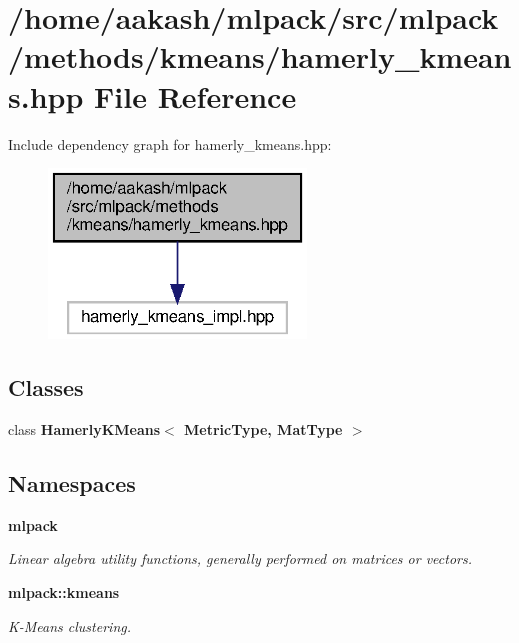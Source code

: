 \section{/home/aakash/mlpack/src/mlpack/methods/kmeans/hamerly\+\_\+kmeans.hpp File Reference}
\label{hamerly__kmeans_8hpp}
Include dependency graph for hamerly\+\_\+kmeans.\+hpp\+:
\nopagebreak
\begin{figure}[H]
\begin{center}
\leavevmode
\includegraphics[width=194pt]{hamerly__kmeans_8hpp__incl}
\end{center}
\end{figure}
\subsection*{Classes}
\begin{DoxyCompactItemize}
\item 
class \textbf{ Hamerly\+K\+Means$<$ Metric\+Type, Mat\+Type $>$}
\end{DoxyCompactItemize}
\subsection*{Namespaces}
\begin{DoxyCompactItemize}
\item 
 \textbf{ mlpack}
\begin{DoxyCompactList}\small\item\em Linear algebra utility functions, generally performed on matrices or vectors. \end{DoxyCompactList}\item 
 \textbf{ mlpack\+::kmeans}
\begin{DoxyCompactList}\small\item\em K-\/\+Means clustering. \end{DoxyCompactList}\end{DoxyCompactItemize}


